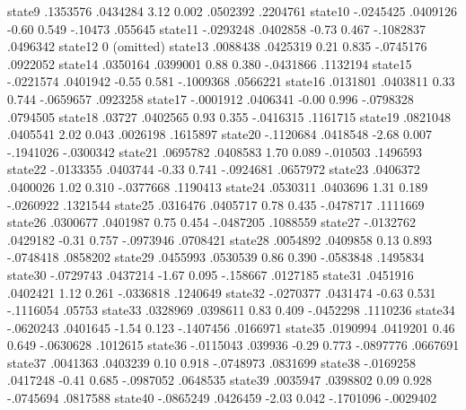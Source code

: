       state9 {\VBAR}   .1353576   .0434284     3.12   0.002     .0502392    .2204761
     state10 {\VBAR}  -.0245425   .0409126    -0.60   0.549      -.10473     .055645
     state11 {\VBAR}  -.0293248   .0402858    -0.73   0.467    -.1082837    .0496342
     state12 {\VBAR}          0  (omitted)
     state13 {\VBAR}   .0088438   .0425319     0.21   0.835    -.0745176    .0922052
     state14 {\VBAR}   .0350164   .0399001     0.88   0.380    -.0431866    .1132194
     state15 {\VBAR}  -.0221574   .0401942    -0.55   0.581    -.1009368    .0566221
     state16 {\VBAR}   .0131801   .0403811     0.33   0.744    -.0659657    .0923258
     state17 {\VBAR}  -.0001912   .0406341    -0.00   0.996    -.0798328    .0794505
     state18 {\VBAR}     .03727   .0402565     0.93   0.355    -.0416315    .1161715
     state19 {\VBAR}   .0821048   .0405541     2.02   0.043     .0026198    .1615897
     state20 {\VBAR}  -.1120684   .0418548    -2.68   0.007    -.1941026   -.0300342
     state21 {\VBAR}   .0695782   .0408583     1.70   0.089     -.010503    .1496593
     state22 {\VBAR}  -.0133355   .0403744    -0.33   0.741    -.0924681    .0657972
     state23 {\VBAR}   .0406372   .0400026     1.02   0.310    -.0377668    .1190413
     state24 {\VBAR}   .0530311   .0403696     1.31   0.189    -.0260922    .1321544
     state25 {\VBAR}   .0316476   .0405717     0.78   0.435    -.0478717    .1111669
     state26 {\VBAR}   .0300677   .0401987     0.75   0.454    -.0487205    .1088559
     state27 {\VBAR}  -.0132762   .0429182    -0.31   0.757    -.0973946    .0708421
     state28 {\VBAR}   .0054892   .0409858     0.13   0.893    -.0748418    .0858202
     state29 {\VBAR}   .0455993   .0530539     0.86   0.390    -.0583848    .1495834
     state30 {\VBAR}  -.0729743   .0437214    -1.67   0.095     -.158667    .0127185
     state31 {\VBAR}   .0451916   .0402421     1.12   0.261    -.0336818    .1240649
     state32 {\VBAR}  -.0270377   .0431474    -0.63   0.531    -.1116054      .05753
     state33 {\VBAR}   .0328969   .0398611     0.83   0.409    -.0452298    .1110236
     state34 {\VBAR}  -.0620243   .0401645    -1.54   0.123    -.1407456    .0166971
     state35 {\VBAR}   .0190994   .0419201     0.46   0.649    -.0630628    .1012615
     state36 {\VBAR}  -.0115043    .039936    -0.29   0.773    -.0897776    .0667691
     state37 {\VBAR}   .0041363   .0403239     0.10   0.918    -.0748973    .0831699
     state38 {\VBAR}  -.0169258   .0417248    -0.41   0.685    -.0987052    .0648535
     state39 {\VBAR}   .0035947   .0398802     0.09   0.928    -.0745694    .0817588
     state40 {\VBAR}  -.0865249   .0426459    -2.03   0.042    -.1701096   -.0029402
